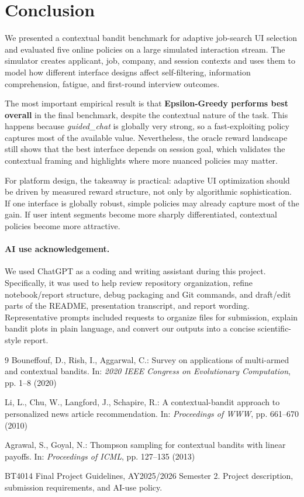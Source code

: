 \documentclass[10pt,twocolumn]{article}
\begin{document}
\section{Conclusion}
We presented a contextual bandit benchmark for adaptive job-search UI selection and evaluated five online policies on a large simulated interaction stream. The simulator creates applicant, job, company, and session contexts and uses them to model how different interface designs affect self-filtering, information comprehension, fatigue, and first-round interview outcomes.

The most important empirical result is that \textbf{Epsilon-Greedy performs best overall} in the final benchmark, despite the contextual nature of the task. This happens because \textit{guided\_chat} is globally very strong, so a fast-exploiting policy captures most of the available value. Nevertheless, the oracle reward landscape still shows that the best interface depends on session goal, which validates the contextual framing and highlights where more nuanced policies may matter.

For platform design, the takeaway is practical: adaptive UI optimization should be driven by measured reward structure, not only by algorithmic sophistication. If one interface is globally robust, simple policies may already capture most of the gain. If user intent segments become more sharply differentiated, contextual policies become more attractive.

\paragraph{AI use acknowledgement.} We used ChatGPT as a coding and writing assistant during this project. Specifically, it was used to help review repository organization, refine notebook/report structure, debug packaging and Git commands, and draft/edit parts of the README, presentation transcript, and report wording. Representative prompts included requests to organize files for submission, explain bandit plots in plain language, and convert our outputs into a concise scientific-style report. 

\begin{thebibliography}{9}
Bouneffouf, D., Rish, I., Aggarwal, C.: Survey on applications of multi-armed and contextual bandits. In: \emph{2020 IEEE Congress on Evolutionary Computation}, pp. 1--8 (2020)

Li, L., Chu, W., Langford, J., Schapire, R.: A contextual-bandit approach to personalized news article recommendation. In: \emph{Proceedings of WWW}, pp. 661--670 (2010)

Agrawal, S., Goyal, N.: Thompson sampling for contextual bandits with linear payoffs. In: \emph{Proceedings of ICML}, pp. 127--135 (2013)

BT4014 Final Project Guidelines, AY2025/2026 Semester 2. Project description, submission requirements, and AI-use policy.\hfill
\end{thebibliography}
\end{document}
